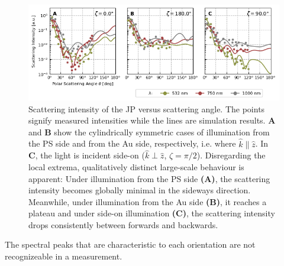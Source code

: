 \documentclass[10pt]{article}
\newcommand{\reffig}[2]{\mbox{\sffamily{Figure \ref{#1}#2}}}
\begin{document}
\begin{multicols}{2}
\begin{figure}[t!]
    \centering
    \includegraphics[width=\textwidth]{[fig] cartesian mieplots (3, placeholder)}
    \caption{Scattering intensity of the JP versus scattering angle. 
    The points signify measured intensities while the lines are simulation results.  
    {\sffamily\bfseries A} and {\sffamily\bfseries B} show the cylindrically symmetric cases of illumination from the PS side and from the Au side, respectively, i.e. where $\hat{k}\parallel\hat{z}$. 
    In {\sffamily\bfseries C}, the light is incident side-on ($\hat{k}\perp\hat{z}$, $\zeta=\pi/2$). 
    Disregarding the local extrema, qualitatively distinct large-scale behaviour is apparent: Under illumination from the PS side {\sffamily\bfseries (A)}, the scattering intensity becomes globally minimal in the sideways direction. 
    Meanwhile, under illumination from the Au side {\sffamily\bfseries (B)}, it reaches a plateau and under side-on illumination {\sffamily\bfseries (C)}, the scattering intensity drops consistently between forwards and backwards.  
    }
    \label{fig:jp-mieplots-oneline}
\end{figure}

The spectral peaks that are characteristic to each orientation are not recognizeable in a measurement. 







\end{multicols}
\end{document}
